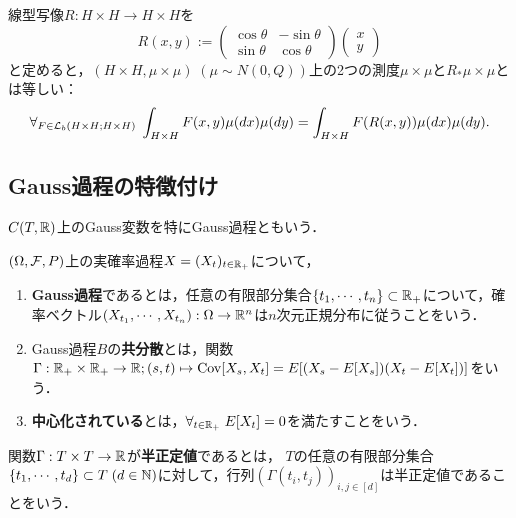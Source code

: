 \documentclass[uplatex,dvipdfmx]{jsreport}
\begin{document}
\begin{corollary}[Gauss測度の回転不変性]
    線型写像$R:H\times H\to H\times H$を
    \[R(x,y):=\begin{pmatrix}\cos\theta&-\sin\theta\\\sin\theta&\cos\theta\end{pmatrix}\begin{pmatrix}x\\y\end{pmatrix}\]
    と定めると，$(H\times H,\mu\times\mu)\;(\mu\sim N(0,Q))$上の2つの測度$\mu\times\mu$と$R_*\mu\times\mu$とは等しい：
    \[\forall_{F\in\mathcal{L}_b(H\times H;H\times H)}\;\int_{H\times H}F(x,y)\mu(dx)\mu(dy)=\int_{H\times H}F(R(x,y))\mu(dx)\mu(dy).\]
\end{corollary}

\subsection{Gauss過程の特徴付け}

\begin{tcolorbox}[colframe=ForestGreen, colback=ForestGreen!10!white,breakable,colbacktitle=ForestGreen!40!white,coltitle=black,fonttitle=\bfseries\sffamily,
title=]
    $C(T,\mathbb{R})$上のGauss変数を特にGauss過程ともいう．
\end{tcolorbox}

\begin{definition}
    $(\Omega,\mathcal{F},P)$上の実確率過程$X=(X_t)_{t\in\mathbb{R}_+}$について，
    \begin{enumerate}
        \item \textbf{Gauss過程}であるとは，任意の有限部分集合$\{t_1,\cdots,t_n\}\subset \mathbb{R}_+$について，確率ベクトル$(X_{t_1},\cdots,X_{t_n}):\Omega\to\mathbb{R}^n$は$n$次元正規分布に従うことをいう．
        \item Gauss過程$B$の\textbf{共分散}とは，関数$\Gamma:\mathbb{R}_+\times\mathbb{R}_+\to\mathbb{R};(s,t)\mapsto\mathrm{Cov}[X_s,X_t]=E[(X_s-E[X_s])(X_t-E[X_t])]$をいう．
        \item \textbf{中心化されている}とは，$\forall_{t\in\mathbb{R}_+}\;E[X_t]=0$を満たすことをいう．
    \end{enumerate}
\end{definition}

\begin{definition}
    関数$\Gamma:T\times T\to\mathbb{R}$が\textbf{半正定値}であるとは，
    $T$の任意の有限部分集合$\{t_1,\cdots,t_d\}\subset T\;(d\in\mathbb{N})$に対して，行列$(\Gamma(t_i,t_j))_{i,j\in[d]}$は半正定値であることをいう．
\end{definition}
\end{document}
